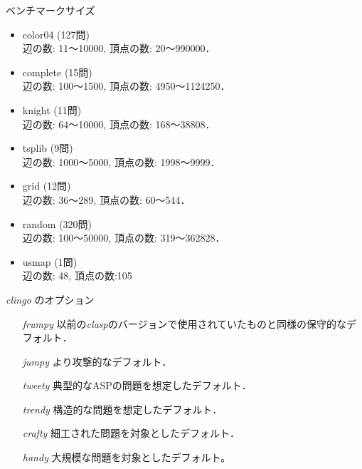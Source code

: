 \documentclass[dvipdfmx,11pt]{beamer}
\begin{document}
\begin{frame}[noframenumbering]{ベンチマークサイズ}
\begin{itemize}
\item \textsf{color04} (127問)\\
  辺の数: 11〜10000, 頂点の数: 20〜990000．
\item \textsf{complete} (15問)\\
  辺の数: 100〜1500, 頂点の数: 4950〜1124250．
\item \textsf{knight} (11問)\\
  辺の数: 64〜10000, 頂点の数: 168〜38808．
\item \textsf{tsplib} (9問)\\
  辺の数: 1000〜5000, 頂点の数: 1998〜9999．
\item \textsf{grid} (12問)\\
  辺の数: 36〜289, 頂点の数: 60〜544．
\item \textsf{random} (320問)\\
  辺の数: 100〜50000, 頂点の数: 319〜362828．
\item \textsf{usmap} (1問)\\
  辺の数: 48, 頂点の数:105 
\end{itemize}
\end{frame}

\begin{frame}[noframenumbering]{\textit{clingo} のオプション}
   \begin{itemize}
     \item [\textit{frumpy}] 以前の\textit{clasp}のバージョンで使用されていたものと同様の保守的なデフォルト．
     \item [\textit{jumpy}] より攻撃的なデフォルト．
     \item [\textit{tweety}] 典型的なASPの問題を想定したデフォルト．
     \item [\textit{trendy}] 構造的な問題を想定したデフォルト．
     \item [\textit{crafty}] 細工された問題を対象としたデフォルト．
     \item [\textit{handy}] 大規模な問題を対象としたデフォルト。
   \end{itemize}
\end{frame}
\end{document}
